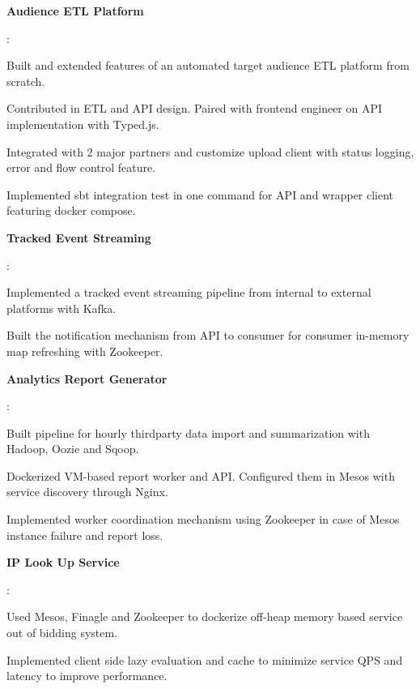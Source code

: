 \documentclass[letterpaper,11pt]{article}
\newcommand{\resumeItem}[2]{
	\item\small{
		\textbf{#1 \hspace{-2pt}}{: #2 \vspace{-2pt}}
	}
}
\begin{document}
	\resumeItem{Audience ETL Platform}{
				\begin{description}[font=$\diamond$\scshape\bfseries,leftmargin=11pt,labelindent=0pt]
					\item Built and extended features of an automated target audience ETL platform from scratch. 
					\item Contributed in ETL and API design. Paired with frontend engineer on API implementation with Typed.js.
					\item Integrated with 2 major partners and customize upload client with status logging, error and flow control feature. 
					\item Implemented sbt integration test in one command for API and wrapper client featuring docker compose.
				\end{description}
	}
	\resumeItem{Tracked Event Streaming}{
				\begin{description}[font=$\diamond$\scshape\bfseries,leftmargin=11pt,labelindent=0pt]
					\item Implemented a tracked event streaming pipeline from internal to external platforms with Kafka.
					\item Built the notification mechanism from API to consumer for consumer in-memory map refreshing with Zookeeper. 
				\end{description}
	}
	\resumeItem{Analytics Report Generator}{
				\begin{description}[font=$\diamond$\scshape\bfseries,leftmargin=11pt,labelindent=0pt]
					\item Built pipeline for hourly thirdparty data import and summarization with Hadoop, Oozie and Sqoop.
					\item Dockerized VM-based report worker and API. Configured them in Mesos with service discovery through Nginx. 
					\item Implemented worker coordination mechanism using Zookeeper in case of Mesos instance failure and report loss.
				\end{description}
	}
	\resumeItem{IP Look Up Service}{
				\begin{description}[font=$\diamond$\scshape\bfseries,leftmargin=11pt,labelindent=0pt]
					\item Used Mesos, Finagle and Zookeeper to dockerize off-heap memory based service out of bidding system.
					\item Implemented client side lazy evaluation and cache to minimize service QPS and latency to improve performance.
				\end{description}
	}
	
\end{document}
